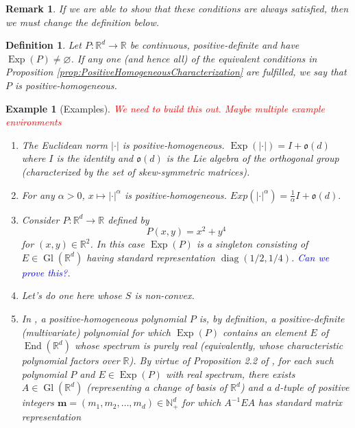 \documentclass[11pt]{article}
\newtheorem{definition}[theorem]{Definition}
\newtheorem{remark}{Remark}
\newtheorem{example}{Example}
\newcommand\End{\operatorname{End}} %
\newcommand\Gl{\operatorname{Gl}}                     %
\newcommand\Exp{\operatorname{Exp}}
\newcommand\diag{\operatorname{diag}}
\begin{document}
\begin{remark}
If we are able to show that these conditions are always satisfied, then we must change the definition below. 
\end{remark}
\textcolor{red}{\hline}

\begin{definition}
Let $P:\mathbb{R}^d\to\mathbb{R}$ be continuous, positive-definite and have $\Exp(P)\neq \varnothing$. If any one (and hence all) of the equivalent conditions in Proposition \ref{prop:PositiveHomogeneousCharacterization} are fulfilled, we say that $P$ is positive-homogeneous.
\end{definition}
\begin{example}[Examples]
\textcolor{red}{We need to build this out. Maybe multiple example environments}
\begin{enumerate}
\item The Euclidean norm $|\cdot|$ is positive-homogeneous. $\Exp(|\cdot|)=I+\mathfrak{o}(d)$ where $I$ is the identity and $\mathfrak{o}(d)$ is the Lie algebra of the orthogonal group (characterized by the set of skew-symmetric matrices).
\item For any $\alpha>0$, $x\mapsto |\cdot|^\alpha$ is positive-homogeneous. $Exp(|\cdot|^{\alpha})=\frac{1}{\alpha}I+\mathfrak{o}(d).$
\item Consider $P:\mathbb{R}^d\to \mathbb{R}$ defined by
\begin{equation*}
P(x,y)=x^2+y^4
\end{equation*}
for $(x,y)\in\mathbb{R}^2$. In this case $\Exp(P)$ is a singleton consisting of $E\in\Gl(\mathbb{R}^d)$ having standard representation $\diag(1/2,1/4)$. \textcolor{blue}{Can we prove this?}.
\item Let's do one here whose $S$ is non-convex.
\item In \cite{Randles2017}, a positive-homogeneous polynomial $P$ is, by definition, a positive-definite (multivariate) polynomial for which $\Exp(P)$ contains an element $E$ of $\End(\mathbb{R}^d)$ whose spectrum is purely real (equivalently, whose characteristic polynomial factors over $\mathbb{R}$). By virtue of Proposition 2.2 of \cite{Randles2017}, for each such polynomial $P$ and $E\in\Exp(P)$ with real spectrum, there exists $A\in\Gl(\mathbb{R}^d)$ (representing a change of basis of $\mathbb{R}^d$) and a $d$-tuple of positive integers $\mathbf{m}=(m_1,m_2,\dots,m_d)\in\mathbb{N}_+^d$ for which $A^{-1}EA$ has standard matrix representation
\begin{equation}\label{eq:DiagonalizableE}

\end{equation}
\end{enumerate}
\end{example}
\end{document}

